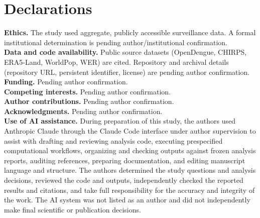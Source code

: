 \documentclass[11pt,a4paper]{article}
\begin{document}
\section*{Declarations}
\textbf{Ethics.} The study used aggregate, publicly accessible surveillance data. A formal institutional determination is pending author/institutional confirmation.\\
\textbf{Data and code availability.} Public source datasets (OpenDengue, CHIRPS, ERA5-Land, WorldPop, WER) are cited. Repository and archival details (repository URL, persistent identifier, license) are pending author confirmation.\\
\textbf{Funding.} Pending author confirmation.\\
\textbf{Competing interests.} Pending author confirmation.\\
\textbf{Author contributions.} Pending author confirmation.\\
\textbf{Acknowledgments.} Pending author confirmation.\\
\textbf{Use of AI assistance.} During preparation of this study, the authors used Anthropic Claude through the Claude Code interface under author supervision to assist with drafting and reviewing analysis code, executing prespecified computational workflows, organizing and checking outputs against frozen analysis reports, auditing references, preparing documentation, and editing manuscript language and structure. The authors determined the study questions and analysis decisions, reviewed the code and outputs, independently checked the reported results and citations, and take full responsibility for the accuracy and integrity of the work. The AI system was not listed as an author and did not independently make final scientific or publication decisions.




\end{document}
